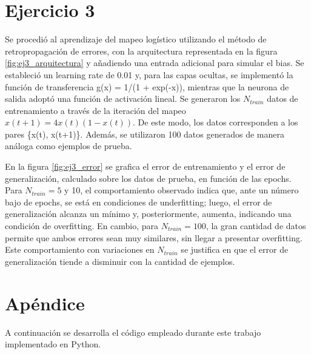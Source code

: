 \documentclass[aps,prb,twocolumn,superscriptaddress,floatfix,longbibliography]{revtex4-2}
\newcounter{para}
\begin{document}
\section*{Ejercicio 3}

Se procedió al aprendizaje del mapeo logístico utilizando el método de retropropagación de errores, con la arquitectura representada en la figura \ref{fig:ej3_arquitectura} y añadiendo una entrada adicional para simular el bias. Se estableció un learning rate de 0.01 y, para las capas ocultas, se implementó la función de transferencia g(x) = 1/(1 + exp(-x)), mientras que la neurona de salida adoptó una función de activación lineal. Se generaron los \(N_{train}\) datos de entrenamiento a través de la iteración del mapeo \(x(t + 1) = 4x(t)(1-x(t))\). De este modo, los datos corresponden a los pares \{x(t), x(t+1)\}. Además, se utilizaron 100 datos generados de manera análoga como ejemplos de prueba.

En la figura \ref{fig:ej3_error} se grafica el error de entrenamiento y el error de generalización, calculado sobre los datos de prueba, en función de las epochs. Para \(N_{train} = 5\) y 10, el comportamiento observado indica que, ante un número bajo de epochs, se está en condiciones de underfitting; luego, el error de generalización alcanza un mínimo y, posteriormente, aumenta, indicando una condición de overfitting. En cambio, para \(N_{train} = 100\), la gran cantidad de datos permite que ambos errores sean muy similares, sin llegar a presentar overfitting. Este comportamiento con variaciones en \(N_{train}\) se justifica en que el error de generalización tiende a disminuir con la cantidad de ejemplos.



\onecolumngrid

\section*{Apéndice}
A continuación se desarrolla el código empleado durante este trabajo implementado en Python.
\end{document}

